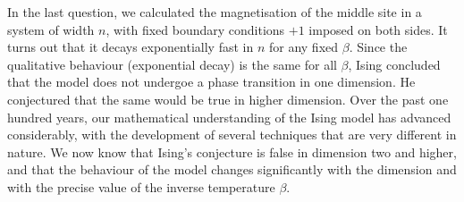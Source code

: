 In the last question, we calculated the magnetisation of the middle site in a system of width $n$,
with fixed boundary conditions $+1$ imposed on both sides.
It turns out that it decays exponentially fast in $n$ for any fixed $\beta$.
Since the qualitative behaviour (exponential decay) is the same for all $\beta$,
Ising concluded that the model does not undergoe a phase transition in one dimension.
He conjectured that the same would be true in higher dimension.
Over the past one hundred years, our mathematical understanding of the Ising model has
advanced considerably,
with the development of several techniques that are very different in nature.
We now know that Ising's conjecture is false in dimension two and higher,
and that the behaviour of the model changes significantly with the dimension
and with the precise value of the inverse temperature $\beta$.




